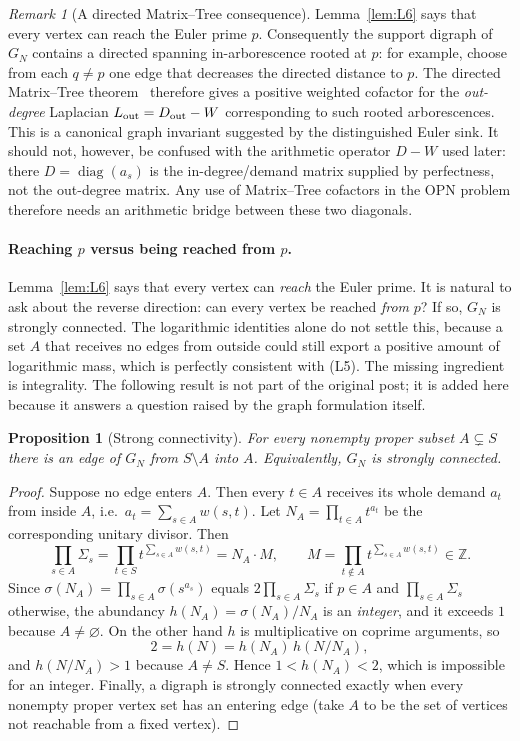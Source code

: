 \documentclass[11pt]{article}
\newtheorem{proposition}[theorem]{Proposition}
\theoremstyle{definition}
\theoremstyle{remark}
\newtheorem{remark}[theorem]{Remark}
\begin{document}
\begin{remark}[A directed Matrix--Tree consequence]
Lemma~\ref{lem:L6} says that every vertex can reach the Euler prime $p$.
Consequently the support digraph of $G_N$ contains a directed spanning
in-arborescence rooted at $p$: for example, choose from each $q\ne p$ one
edge that decreases the directed distance to $p$.  The directed
Matrix--Tree theorem~\cite{Chaiken} therefore gives a positive weighted
cofactor for the \emph{out-degree} Laplacian
$L_{\rm out}=D_{\rm out}-W$ corresponding to such rooted arborescences.
This is a canonical graph invariant suggested by the distinguished Euler
sink.  It should not, however, be confused with the arithmetic operator
$D-W$ used later: there $D=\operatorname{diag}(a_s)$ is the in-degree/demand
matrix supplied by perfectness, not the out-degree matrix.  Any use of
Matrix--Tree cofactors in the OPN problem therefore needs an arithmetic
bridge between these two diagonals.
\end{remark}

\paragraph{Reaching $p$ versus being reached from $p$.}
Lemma~\ref{lem:L6} says that every vertex can \emph{reach} the Euler prime.
It is natural to ask about the reverse direction: can every vertex be reached
\emph{from} $p$?  If so, $G_N$ is strongly connected.  The logarithmic
identities alone do not settle this, because a set $A$ that receives no edges
from outside could still export a positive amount of logarithmic mass, which
is perfectly consistent with (L5).  The missing ingredient is integrality.
The following result is not part of the original post; it is added here
because it answers a question raised by the graph formulation itself.

\begin{proposition}[Strong connectivity]\label{prop:strong}
For every nonempty proper subset $A\subsetneq S$ there is an edge of $G_N$
from $S\setminus A$ into $A$.  Equivalently, $G_N$ is strongly connected.
\end{proposition}

\begin{proof}
Suppose no edge enters $A$.  Then every $t\in A$ receives its whole demand
$a_t$ from inside $A$, i.e.\ $a_t=\sum_{s\in A}w(s,t)$.  Let
$N_A=\prod_{t\in A}t^{a_t}$ be the corresponding unitary divisor.  Then
\[
\prod_{s\in A}\Sigma_s
=\prod_{t\in S}t^{\sum_{s\in A}w(s,t)}
=N_A\cdot M,
\qquad
M=\prod_{t\notin A}t^{\sum_{s\in A}w(s,t)}\in\mathbb Z .
\]
Since $\sigma(N_A)=\prod_{s\in A}\sigma(s^{a_s})$ equals
$2\prod_{s\in A}\Sigma_s$ if $p\in A$ and $\prod_{s\in A}\Sigma_s$ otherwise,
the abundancy $h(N_A)=\sigma(N_A)/N_A$ is an \emph{integer}, and it exceeds
$1$ because $A\ne\varnothing$.  On the other hand $h$ is multiplicative on
coprime arguments, so
\[
2=h(N)=h(N_A)\,h(N/N_A),
\]
and $h(N/N_A)>1$ because $A\ne S$.  Hence $1<h(N_A)<2$, which is impossible
for an integer.  Finally, a digraph is strongly connected exactly when every
nonempty proper vertex set has an entering edge (take $A$ to be the set of
vertices not reachable from a fixed vertex).
\end{proof}
\end{document}
